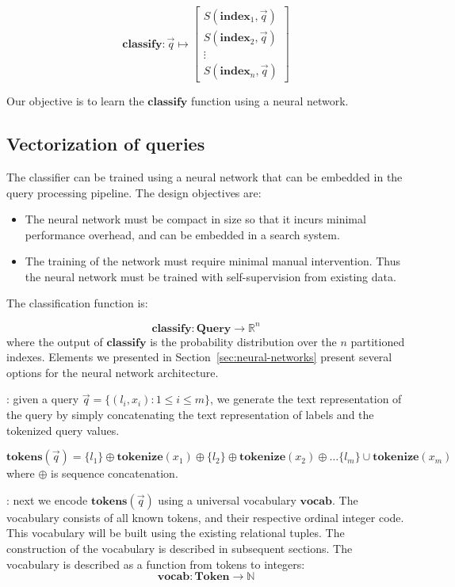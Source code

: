 $$
\mathbf{classify} : \vec q \mapsto \left[
\begin{array}{c}
    S(\mathbf{index}_1, \vec q) \\
    S(\mathbf{index}_2, \vec q) \\
    \vdots \\
    S(\mathbf{index}_n, \vec q)
\end{array}
\right]
$$

Our objective is to learn the $\mathbf{classify}$ function using a neural network.

\subsection{Vectorization of queries}

The classifier can be trained using a neural network that can be embedded in the query processing pipeline.
The design objectives are:
\begin{itemize}
    \item The neural network must be compact in size so that it incurs minimal performance overhead, and can be embedded in a search system.
    \item The training of the network must require minimal manual intervention.  Thus the neural network must be trained with self-supervision from existing data.
\end{itemize}

The classification function is:

\begin{equation}
    \mathbf{classify} : \mathbf{Query} \to \mathbb{R}^n
\end{equation}
where the output of $\mathbf{classify}$ is the probability distribution over the $n$ partitioned indexes. Elements we presented in Section~\ref{sec:neural-networks} present several options for the neural network architecture.

:  given a query $\vec q=\{(l_i, x_i): 1\leq i \leq m\}$, we generate the text representation of the query by simply concatenating the text representation of labels and the tokenized query values.

$$
\mathbf{tokens}(\vec q) = \{l_1\} \oplus \mathbf{tokenize}(x_1) \oplus \{l_2\} \oplus \mathbf{tokenize}(x_2) \oplus \dots
\{l_m\} \cup \mathbf{tokenize}(x_m)
$$
where $\oplus$ is sequence concatenation.

: next we encode $\mathbf{tokens}(\vec q)$ using a universal
vocabulary $\mathbf{vocab}$.  The vocabulary consists of all known tokens, and their respective
ordinal integer code.  This vocabulary will be built using the existing relational tuples.  The construction of the vocabulary is described in subsequent sections.  The vocabulary is described as a function from tokens to integers:
$$ \mathbf{vocab} : \mathbf{Token} \to \mathbb{N}$$

